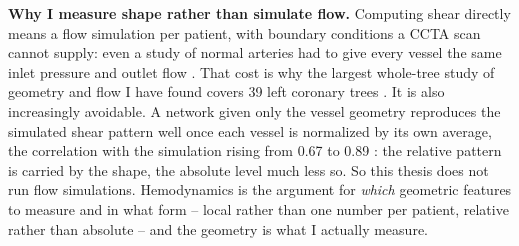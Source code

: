 \textbf{Why I measure shape rather than simulate flow.}
Computing shear directly means a flow simulation per patient, with boundary conditions a CCTA scan
cannot supply: even a study of normal arteries had to give every vessel the same inlet pressure and
outlet flow \cite{schultz2023ess}.
That cost is why the largest whole-tree study of geometry and flow I have found covers 39 left
coronary trees \cite{zhang2024curvature}.
It is also increasingly avoidable. A network given only the vessel geometry reproduces the simulated
shear pattern well once each vessel is normalized by its own average, the correlation with the
simulation rising from 0.67 to 0.89 \cite{griffo2026wss}: the relative pattern is carried by the
shape, the absolute level much less so.
So this thesis does not run flow simulations. Hemodynamics is the argument for \emph{which}
geometric features to measure and in what form -- local rather than one number per patient, relative
rather than absolute -- and the geometry is what I actually measure.

